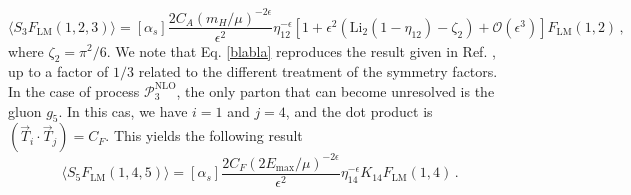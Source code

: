 \documentclass[a4paper, 12pt]{book}
\begin{document}
\begin{equation}
  \langle S_3 F_\mathrm{LM}(1,2,3) \rangle = [\alpha_s]  \frac{2 C_A (m_H/\mu)^{-2 \epsilon}}{\epsilon^2} \eta_{12}^{-\epsilon}[1+\epsilon^2(\mathrm{Li}_2(1-\eta_{12})-\zeta_2)+\mathcal{O}(\epsilon^3)]F_\mathrm{LM}(1,2) \, ,
  \label{blabla}
\end{equation}
where $\zeta_2 = \pi^2/6$. We note that Eq. \ref{blabla} reproduces the result given in Ref. \cite{Caola:1907}, up to a factor of $1/3$ related to the different treatment of the symmetry factors. \\

In the case of process $\mathcal{P}_{3}^{\mathrm{NLO}}$, the only parton that can become unresolved is the gluon $g_5$. In this cas, we have $i=1$ and $j=4$, and the dot product is $(\vec{T}_i \cdot \vec{T}_j)=C_F$. This yields the following result
\begin{equation}
  \langle S_5 F_\mathrm{LM}(1,4,5) \rangle =  [\alpha_s]  \frac{2 C_F (2E_{\mathrm{max}}/\mu)^{-2\epsilon} }{\epsilon^2} \eta_{14}^{-\epsilon} K_{14} F_\mathrm{LM}(1,4) \, .
\end{equation}

\end{document}
